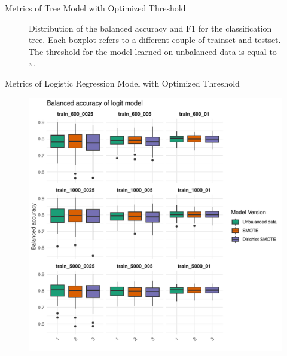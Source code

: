\documentclass{beamer}
\begin{document}
\begin{frame}{Metrics of Tree Model with Optimized Threshold}
\begin{figure}
\begin{minipage}{0.42\textwidth}
      \label{fig:label9}
    \end{minipage}
    \caption{Distribution of the balanced accuracy and F1 for the classification tree. Each boxplot refers to a different couple of trainset and testset. The threshold for the model learned on unbalanced data is equal to $\pi$.}
  \end{figure}
\end{frame}

\begin{frame}{Metrics of Logistic Regression Model with Optimized Threshold}
  \begin{figure}
    \begin{minipage}{0.42\textwidth}
      \centering
      \includegraphics[width=\linewidth]{images/Logit_balanced_accuracy_optimized_threshold.pdf}
      \label{fig:label10}
    \end{minipage}
    \hfill
    \begin{minipage}{0.42\textwidth}
      \centering

\end{minipage}
\end{figure}
\end{frame}
\end{document}
